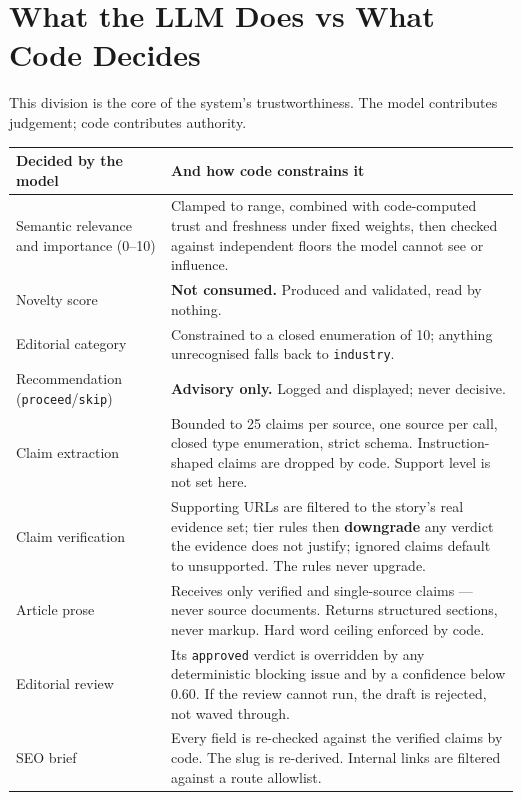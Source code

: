 \documentclass[11pt,a4paper]{article}
\newcommand{\brk}{\hyphenpenalty=0\exhyphenpenalty=0\relax}
\newcommand{\code}[1]{\texttt{\small\brk #1}}
\begin{document}
\section{What the LLM Does vs What Code Decides}

This division is the core of the system's trustworthiness. The model contributes
judgement; code contributes authority.

\begin{center}
\small
\begin{tabularx}{\textwidth}{@{}>{\RaggedRight}p{5.3cm} >{\RaggedRight}X@{}}
\toprule
\textcolor{aitkAccent}{\textbf{Decided by the model}} & \textbf{And how code constrains it} \\
\midrule
Semantic relevance and importance (0--10) & Clamped to range, combined with
  code-computed trust and freshness under fixed weights, then checked against
  independent floors the model cannot see or influence. \\
Novelty score & \textbf{Not consumed.} Produced and validated, read by nothing. \\
Editorial category & Constrained to a closed enumeration of 10; anything
  unrecognised falls back to \code{industry}. \\
Recommendation (\code{proceed}/\code{skip}) & \textbf{Advisory only.} Logged and
  displayed; never decisive. \\
Claim extraction & Bounded to 25 claims per source, one source per call, closed
  type enumeration, strict schema. Instruction-shaped claims are dropped by code.
  Support level is not set here. \\
Claim verification & Supporting URLs are filtered to the story's real evidence set;
  tier rules then \textbf{downgrade} any verdict the evidence does not justify;
  ignored claims default to unsupported. The rules never upgrade. \\
Article prose & Receives only verified and single-source claims --- never source
  documents. Returns structured sections, never markup. Hard word ceiling enforced
  by code. \\
Editorial review & Its \code{approved} verdict is overridden by any deterministic
  blocking issue and by a confidence below 0.60. If the review cannot run, the
  draft is rejected, not waved through. \\
SEO brief & Every field is re-checked against the verified claims by code. The
  slug is re-derived. Internal links are filtered against a route allowlist. \\
\bottomrule
\end{tabularx}
\end{center}
\end{document}

